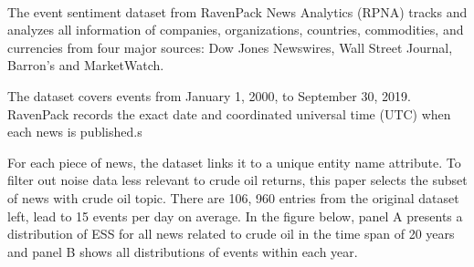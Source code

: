 \documentclass[12pt]{article}
\begin{document}
	\paragraph{} The event sentiment dataset from RavenPack News Analytics (RPNA) tracks and analyzes all information of companies, organizations, countries, commodities, and currencies from four major sources: Dow Jones Newswires, Wall Street Journal, Barron’s and MarketWatch.
	\par The dataset covers events from January 1, 2000, to September 30, 2019. RavenPack records the exact date and coordinated universal time (UTC) when each news is published.s
	\par For each piece of news, the dataset links it to a unique entity name attribute. To filter out noise data less relevant to crude oil returns, this paper selects the subset of news with crude oil topic. There are 106, 960 entries from the original dataset left, lead to 15 events per day on average. In the figure below, panel A presents a distribution of ESS for all news related to crude oil in the time span of 20 years and panel B shows all distributions of events within each year.
\end{document}
